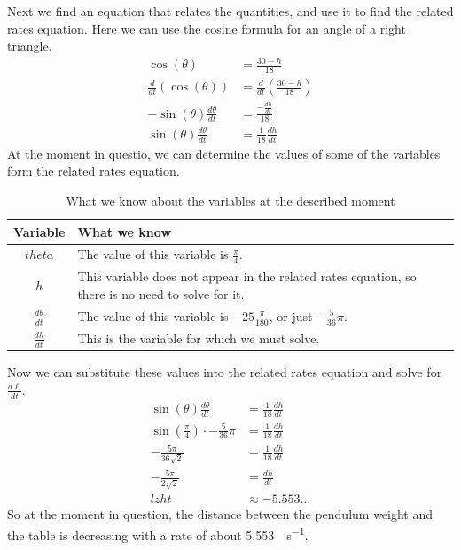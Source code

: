 \documentclass[10pt,oneside,]{book}
\theoremstyle{plain}
\theoremstyle{definition}
\numberwithin{equation}{section}
\newcommand{\fe}[2]{#1\mathopen{}\left(#2\right)\mathclose{}}
\newcommand{\lz}[2]{\frac{d#1}{d#2}}
\newcommand{\lzoo}[2]{{\frac{d}{d#1}}{\left(#2\right)}}
\begin{document}
\par
Next we find an equation that relates the quantities, and use it to find the related rates equation. Here we can use the cosine formula for an angle of a right triangle.\begin{align*}
\fe{\cos}{\theta}&=\frac{30-h}{18}\\
\lzoo{t}{\fe{\cos}{\theta}}&=\lzoo{t}{\frac{30-h}{18}}\\
-\fe{\sin}{\theta}\lz{\theta}{t}&=\frac{-\lz{h}{t}}{18}\\
\fe{\sin}{\theta}\lz{\theta}{t}&=\frac{1}{18}\lz{h}{t}
\end{align*}At the moment in questio, we can determine the values of some of the variables form the related rates equation.%
\begin{table}
\centering
\caption{What we know about the variables at the described moment\label{table-48}}
\begin{tabular}{cp{4in}}
\toprule
Variable&What we know\\
\midrule
\(theta\)&The value of this variable is \(\frac{\pi}{4}\).\\
\midrule
\(h\)&This variable does not appear in the related rates equation, so there is no need to solve for it.\\
\midrule
\(\lz{\theta}{t}\)&The value of this variable is \(-25\frac{\pi}{180}\), or just \(-\frac{5}{36}\pi\).\\
\midrule
\(\lz{h}{t}\)&This is the variable for which we must solve.\\
\bottomrule
\end{tabular}
\end{table}
\par
Now we can substitute these values into the related rates equation and solve for \(\lz{\ell}{t}\).\begin{align*}
\fe{\sin}{\theta}\lz{\theta}{t}&=\frac{1}{18}\lz{h}{t}\\
\fe{\sin}{\frac{\pi}{4}}\cdot-\frac{5}{36}\pi&=\frac{1}{18}\lz{h}{t}\\
-\frac{5\pi}{36\sqrt{2}}&=\frac{1}{18}\lz{h}{t}\\
-\frac{5\pi}{2\sqrt{2}}&=\lz{h}{t}\\
lz{h}{t}&\approx-5.553\ldots
\end{align*}So at the moment in question, the distance between the pendulum weight and the table is decreasing with a rate of about \SI{5.553}{\inch\per\second}.%
\par\smallskip
\end{document}
